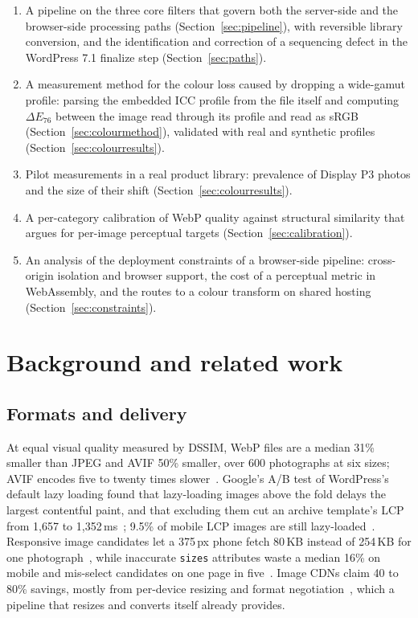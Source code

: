 \documentclass[sigconf,nonacm,screen]{acmart}
\begin{document}
\begin{enumerate}
  \item A pipeline on the three core filters that govern both the server-side and the browser-side processing paths (Section~\ref{sec:pipeline}), with reversible library conversion, and the identification and correction of a sequencing defect in the WordPress 7.1 finalize step (Section~\ref{sec:paths}).
  \item A measurement method for the colour loss caused by dropping a wide-gamut profile: parsing the embedded ICC profile from the file itself and computing $\Delta E_{76}$ between the image read through its profile and read as sRGB (Section~\ref{sec:colourmethod}), validated with real and synthetic profiles (Section~\ref{sec:colourresults}).
  \item Pilot measurements in a real product library: prevalence of Display P3 photos and the size of their shift (Section~\ref{sec:colourresults}).
  \item A per-category calibration of WebP quality against structural similarity that argues for per-image perceptual targets (Section~\ref{sec:calibration}).
  \item An analysis of the deployment constraints of a browser-side pipeline: cross-origin isolation and browser support, the cost of a perceptual metric in WebAssembly, and the routes to a colour transform on shared hosting (Section~\ref{sec:constraints}).
\end{enumerate}

\section{Background and related work}

\subsection{Formats and delivery}

At equal visual quality measured by DSSIM, WebP files are a median 31\% smaller than JPEG and AVIF 50\% smaller, over 600 photographs at six sizes; AVIF encodes five to twenty times slower~\cite{aleksandersen2020}. Google's A/B test of WordPress's default lazy loading found that lazy-loading images above the fold delays the largest contentful paint, and that excluding them cut an archive template's LCP from 1,657 to 1,352\,ms~\cite{webdevlazy}; 9.5\% of mobile LCP images are still lazy-loaded~\cite{almanac2024media}. Responsive image candidates let a 375\,px phone fetch 80\,KB instead of 254\,KB for one photograph~\cite{nearform2019}, while inaccurate \texttt{sizes} attributes waste a median 16\% on mobile and mis-select candidates on one page in five~\cite{almanac2024media}. Image CDNs claim 40 to 80\% savings, mostly from per-device resizing and format negotiation~\cite{webdevcdn}, which a pipeline that resizes and converts itself already provides.
\end{document}

